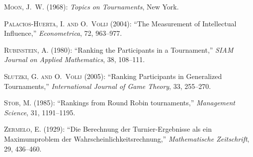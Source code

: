 \documentclass[a4paper,10pt]{article}
\theoremstyle{remark}
\begin{document}
\begin{thebibliography}{16}
\textsc{Moon, J.~W.} (1968): \emph{Topics on Tournaments}, New York.

\textsc{Palacios-Huerta, I. and O.~Volij} (2004): \enquote{The Measurement of
  Intellectual Influence,} \emph{Econometrica}, 72, 963--977.

\textsc{Rubinstein, A.} (1980): \enquote{Ranking the Participants in a
  Tournament,} \emph{SIAM Journal on Applied Mathematics}, 38, 108--111.

\textsc{Slutzki, G. and O.~Volij} (2005): \enquote{Ranking Participants in
  Generalized Tournaments,} \emph{International Journal of Game Theory}, 33,
  255--270.

\textsc{Stob, M.} (1985): \enquote{Rankings from Round Robin tournaments,}
  \emph{Management Science}, 31, 1191--1195.

\textsc{Zermelo, E.} (1929): \enquote{Die Berechnung der Turnier-Ergebnisse als
  ein Maximumproblem der Wahrscheinlichkeitsrechnung,} \emph{Mathematische
  Zeitschrift}, 29, 436--460.

\end{thebibliography}
\end{document}
